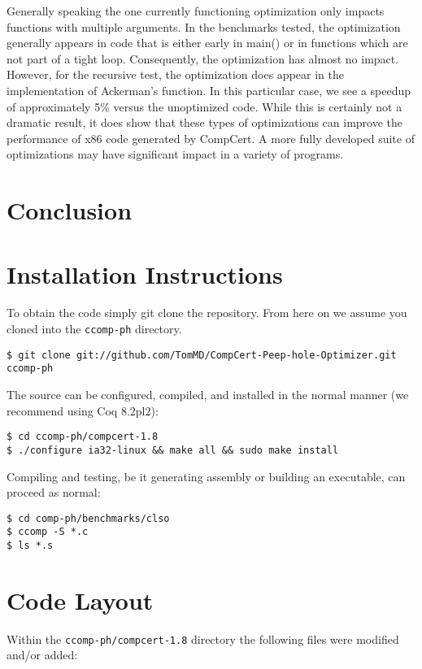 \documentclass{article}
\begin{document}
Generally speaking the one currently functioning optimization only
impacts functions with multiple arguments. In the benchmarks tested,
the optimization generally appears in code that is either early in
main() or in functions which are not part of a tight
loop. Consequently, the optimization has almost no impact. However,
for the recursive test, the optimization does appear in the
implementation of Ackerman's function. In this particular case, we see
a speedup of approximately 5\% versus the unoptimized code. While this
is certainly not a dramatic result, it does show that these types of
optimizations can improve the performance of x86 code generated by
CompCert. A more fully developed suite of optimizations may have
significant impact in a variety of programs. 

\section{Conclusion}

\clearpage
\appendix
\section{Installation Instructions}
To obtain the code simply git clone the repository.  From here on we
assume you cloned into the {\tt ccomp-ph} directory.

\begin{verbatim}
$ git clone git://github.com/TomMD/CompCert-Peep-hole-Optimizer.git ccomp-ph
\end{verbatim}

The source can be configured, compiled, and installed in the normal
manner (we recommend using Coq 8.2pl2):

\begin{verbatim}
$ cd ccomp-ph/compcert-1.8
$ ./configure ia32-linux && make all && sudo make install
\end{verbatim}

Compiling and testing, be it generating assembly or building an
executable, can proceed as normal:

\begin{verbatim}
$ cd comp-ph/benchmarks/clso
$ ccomp -S *.c
$ ls *.s
\end{verbatim}

\section{Code Layout}
Within the {\tt ccomp-ph/compcert-1.8} directory the following files
were modified and/or added:
\end{document}
